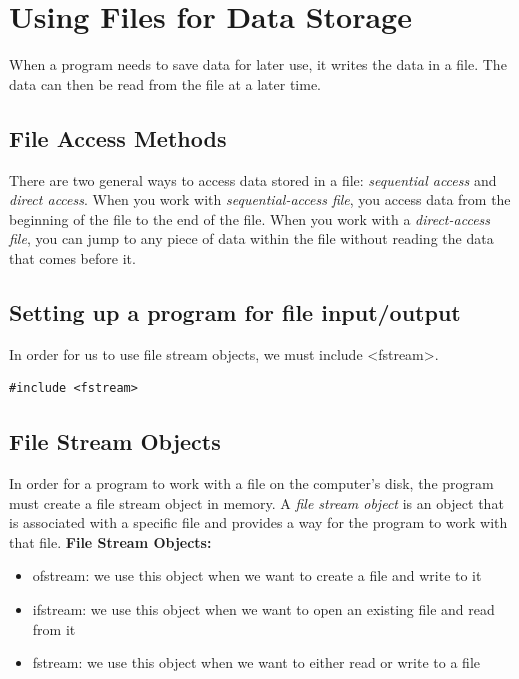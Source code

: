 \documentclass{report}
\begin{document}
    \pagebreak \bigbreak \noindent 
    \section{\LARGE Using Files for Data Storage}
    \bigbreak \noindent 
    \begin{concept}
 When a program needs to save data for later use, it writes the data in a file. The data can then be read from the file at a later time.
	\end{concept}
    \bigbreak \noindent 
    \subsection{File Access Methods}
    \bigbreak \noindent 
    There are two general ways to access data stored in a file: \textit{sequential access} and \textit{direct access}. When you work with \textit{sequential-access file}, you access data from the beginning of the file to the end of the file.
    \bigbreak \noindent 
    When you work with a \textit{direct-access file}, you can jump to any piece  of data within the file without reading the data that comes before it.
    \bigbreak \noindent 
    \subsection{Setting up a program for file input/output}
    \bigbreak \noindent 
    In order for us to use file stream objects, we must include <fstream>.
    \bigbreak \noindent 
    \sepline
    \begin{verbatim}
#include <fstream>
    \end{verbatim}
    \sepline
    \bigbreak \noindent 
    \subsection{File Stream Objects}
    \bigbreak \noindent 
    In order for a program to work with a file on the computer's disk, the program must create a file stream object in memory. A \textit{file stream object} is an object that is associated with a specific file and provides a way for the program to work with that file. 
    \bigbreak \noindent 
    \textbf{File Stream Objects:}
    \begin{itemize}
        \item ofstream: we use this object when we want to create a file and write to it
        \item ifstream: we use this object when we want to open an existing file and read from it
        \item fstream: we use this object when we want to either read or write to a file
    \end{itemize}
\end{document}
